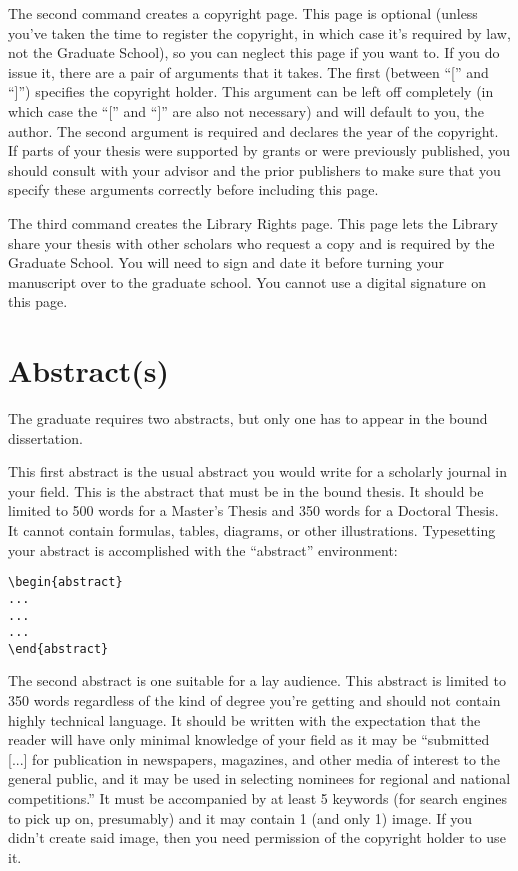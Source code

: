 The second command creates a copyright page.  This page is optional (unless you've taken the time to register the copyright, in which case it's required by law, not the Graduate School), so you can neglect this page if you want to.  If you do issue it, there are a pair of arguments that it takes.  The first (between ``['' and ``]'') specifies the copyright holder.  This argument can be left off completely (in which case the ``['' and ``]'' are also not necessary) and will default to you, the author.  The second argument is required and declares the year of the copyright.  If parts of your thesis were supported by grants or were previously published, you should consult with your advisor and the prior publishers to make sure that you specify these arguments correctly before including this page.

The third command creates the Library Rights page.  This page lets the Library share your thesis with other scholars who request a copy and is required by the Graduate School.  You will need to sign and date it before turning your manuscript over to the graduate school.  You cannot use a digital signature on this page.

\section{Abstract(s)}\label{abstracts}
The graduate requires two abstracts, but only one has to appear in the bound dissertation.

This first abstract is the usual abstract you would write for a scholarly journal in your field.  This is the abstract that must be in the bound thesis.  It should be limited to 500 words for a Master's Thesis and 350 words for a Doctoral Thesis.  It cannot contain formulas, tables, diagrams, or other illustrations.  Typesetting your abstract is accomplished with the ``abstract'' environment:
\begin{verbatim}
\begin{abstract}
...
...
...
\end{abstract}
\end{verbatim}

The second abstract is one suitable for a lay audience.  This abstract is limited to 350 words regardless of the kind of degree you're getting and should not contain highly technical language.  It should be written with the expectation that the reader will have only minimal knowledge of your field as it may be ``submitted [...] for publication in newspapers, magazines, and other media of
interest to the general public, and it may be used in selecting nominees for regional and
national competitions.''  It must be accompanied by at least 5 keywords (for search engines to pick up on, presumably) and it may contain 1 (and only 1) image.  If you didn't create said image, then you need permission of the copyright holder to use it.

